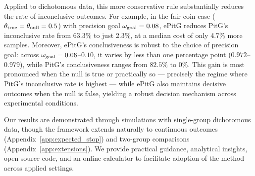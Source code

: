 Applied to dichotomous data, this more conservative rule substantially reduces the rate
of inconclusive outcomes. For example, in the fair coin case
($\theta_{\rm true}=\theta_{\rm null}=0.5$) with precision goal $\omega_{\rm goal}=0.08$,
ePitG reduces PitG's inconclusive rate from 63.3\% to just 2.3\%,
at a median cost of only 4.7\% more samples.
Moreover, ePitG's conclusiveness is robust to the choice of precision goal: across
$\omega_{\rm goal}=0.06$--$0.10$, it varies by less than one percentage point
($0.972$--$0.979$), while PitG's conclusiveness ranges from $82.5\%$ to $0\%$.
This gain is most pronounced when the null is true or practically so --- precisely the
regime where PitG's inconclusive rate is highest --- while ePitG also maintains decisive
outcomes when the null is false, yielding a robust decision mechanism across experimental conditions.

Our results are demonstrated through simulations with single-group dichotomous data, though the
framework extends naturally to continuous outcomes (Appendix~\ref{app:expected_stop}) and
two-group comparisons (Appendix~\ref{app:extensions}).
We provide practical guidance, analytical insights, open-source code, and an online calculator
to facilitate adoption of the method across applied settings.
